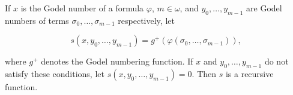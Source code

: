 If $x$ is the Godel number of a formula $\varphi$, $m \in \omega$, and $y_0, \dots, y_{m-1}$ are Godel numbers of terms $\sigma_0, \dots, \sigma_{m-1}$ respectively, let

$$s(x, y_0, \dots, y_{m-1}) = g^{+}(\varphi(\sigma_0, \dots, \sigma_{m-1})),$$

where $g^{+}$ denotes the Godel numbering function. If $x$ and $y_0, \dots, y_{m-1}$ do not satisfy these conditions, let $s(x, y_0, \dots, y_{m-1}) = 0$. Then $s$ is a recursive function.
